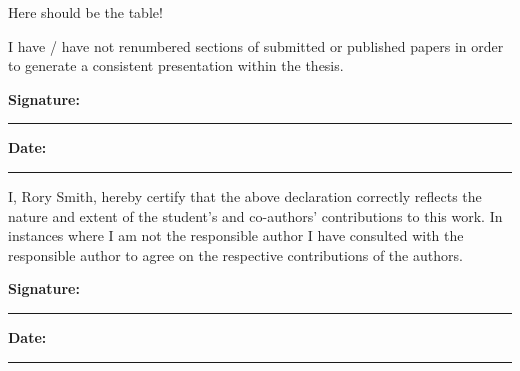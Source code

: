 {Here should be the table!

I have / have not renumbered sections of submitted or published papers
in order to generate a consistent presentation within the thesis.

\textbf{Signature:}\\
\rule[1em]{25em}{0.5pt} 

\textbf{Date:}\\
\rule[1em]{25em}{0.5pt}


I, Rory Smith, hereby certify that the above declaration correctly reflects the
nature and extent of the student's and co-authors' contributions to this
work.
In instances where I am not the responsible author I have
consulted with the responsible author to agree on the respective
contributions of the authors.

\textbf{Signature:}\\
\rule[1em]{25em}{0.5pt} 
\textbf{Date:}\\
\rule[1em]{25em}{0.5pt}

}
